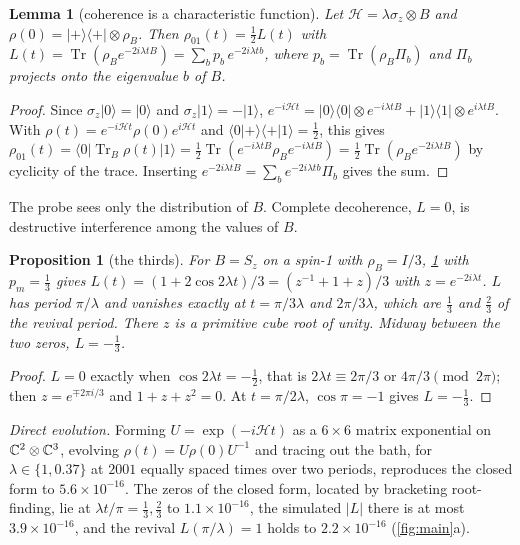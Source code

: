 \documentclass[11pt]{article}
\newtheorem{lemma}[theorem]{Lemma}
\newtheorem{proposition}[theorem]{Proposition}
\theoremstyle{definition}\newtheorem{definition}[theorem]{Definition}
\theoremstyle{remark}\newtheorem{remark}[theorem]{Remark}
\begin{document}
\begin{lemma}[coherence is a characteristic function]\label{lem:char}
Let $\mathcal H=\lambda\sigma_z\otimes B$ and $\rho(0)=|+\rangle\langle+|\otimes\rho_B$. Then $\rho_{01}(t)=\frac12L(t)$ with $L(t)=\operatorname{Tr}(\rho_Be^{-2i\lambda tB})=\sum_bp_b\,e^{-2i\lambda tb}$, where $p_b=\operatorname{Tr}(\rho_B\Pi_b)$ and $\Pi_b$ projects onto the eigenvalue $b$ of $B$.
\end{lemma}
\begin{proof}
Since $\sigma_z|0\rangle=|0\rangle$ and $\sigma_z|1\rangle=-|1\rangle$, $e^{-i\mathcal Ht}=|0\rangle\langle0|\otimes e^{-i\lambda tB}+|1\rangle\langle1|\otimes e^{i\lambda tB}$. With $\rho(t)=e^{-i\mathcal Ht}\rho(0)e^{i\mathcal Ht}$ and $\langle0|{+}\rangle\langle{+}|1\rangle=\frac12$, this gives $\rho_{01}(t)=\langle0|\operatorname{Tr}_B\rho(t)|1\rangle=\frac12\operatorname{Tr}(e^{-i\lambda tB}\rho_Be^{-i\lambda tB})=\frac12\operatorname{Tr}(\rho_Be^{-2i\lambda tB})$ by cyclicity of the trace. Inserting $e^{-2i\lambda tB}=\sum_be^{-2i\lambda tb}\Pi_b$ gives the sum.
\end{proof}
The probe sees only the distribution of $B$. Complete decoherence, $L=0$, is destructive interference among the values of $B$.

\begin{proposition}[the thirds]\label{prop:thirds}
For $B=S_z$ on a spin-1 with $\rho_B=I/3$, \cref{lem:char} with $p_m=\frac13$ gives $L(t)=(1+2\cos2\lambda t)/3=(z^{-1}+1+z)/3$ with $z=e^{-2i\lambda t}$. $L$ has period $\pi/\lambda$ and vanishes exactly at $t=\pi/3\lambda$ and $2\pi/3\lambda$, which are $\frac13$ and $\frac23$ of the revival period. There $z$ is a primitive cube root of unity. Midway between the two zeros, $L=-\frac13$.
\end{proposition}
\begin{proof}
$L=0$ exactly when $\cos2\lambda t=-\frac12$, that is $2\lambda t\equiv2\pi/3$ or $4\pi/3\pmod{2\pi}$; then $z=e^{\mp2\pi i/3}$ and $1+z+z^2=0$. At $t=\pi/2\lambda$, $\cos\pi=-1$ gives $L=-\frac13$.
\end{proof}
\emph{Direct evolution.} Forming $U=\exp(-i\mathcal Ht)$ as a $6\times6$ matrix exponential on $\mathbb C^2\otimes\mathbb C^3$, evolving $\rho(t)=U\rho(0)U^{-1}$ and tracing out the bath, for $\lambda\in\{1,0.37\}$ at $2001$ equally spaced times over two periods, reproduces the closed form to $5.6\times10^{-16}$. The zeros of the closed form, located by bracketing root-finding, lie at $\lambda t/\pi=\frac13,\frac23$ to $1.1\times10^{-16}$, the simulated $|L|$ there is at most $3.9\times10^{-16}$, and the revival $L(\pi/\lambda)=1$ holds to $2.2\times10^{-16}$ (\cref{fig:main}a).
\end{document}

